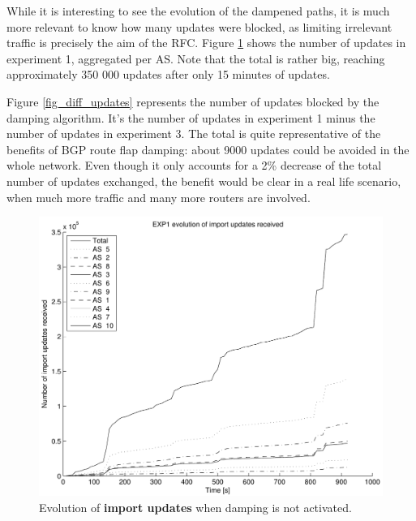 \documentclass[a4paper,english]{IEEEtran}
\begin{document}
While it is interesting to see the evolution of the dampened paths, it is much more relevant 
to know how many updates were blocked, as limiting irrelevant traffic is precisely the aim of
the RFC. Figure \ref{fig_exp1_updates} shows the number of updates in experiment 1, aggregated 
per AS. Note that the total is rather big, reaching approximately 350 000 updates after only 
15 minutes of updates. 

Figure \ref{fig_diff_updates} represents the number of updates blocked by the damping algorithm. 
It's the number of updates in experiment 1 minus the number of updates in experiment 3. The 
total is quite representative of the benefits of BGP route flap damping: about 9000 updates 
could be avoided in the whole network. Even though it only accounts for a 2\% decrease 
of the total number of updates exchanged, the benefit would be clear in a real life scenario, 
when much more traffic and many more routers are involved.

\begin{figure}
\begin{center}
\includegraphics[scale=.5]{img/exp1_updates.pdf}
\end{center}
\caption{Evolution of \textbf{import updates} when damping is not activated.}
\label{fig_exp1_updates}
\end{figure}
\end{document}
